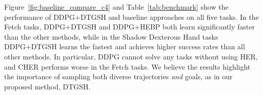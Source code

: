 Figure~\ref{fig:baseline_compare_c4} and Table~\ref{tab:benchmark} show the performance of DDPG+DTGSH and baseline approaches on all five tasks. In the Fetch tasks, DDPG+DTGSH and DDPG+HEBP both learn significantly faster than the other methods, while in the Shadow Dexterous Hand tasks DDPG+DTGSH learns the fastest and achieves higher success rates than all other methods. In particular, DDPG cannot solve any tasks without using HER, and CHER performs worse in the Fetch tasks. We believe the results highlight the importance of sampling both diverse trajectories \textit{and} goals, as in our proposed method, DTGSH.
\begin{table}[h]
    \centering
    \vspace{0.2em}
    \caption[Average success rate of DTGSH and other baselines in the final epoch during training.]{Final mean success rate $\pm$ standard deviation, with best results in \textbf{bold}.}
    \label{tab:benchmark}
\end{table}
